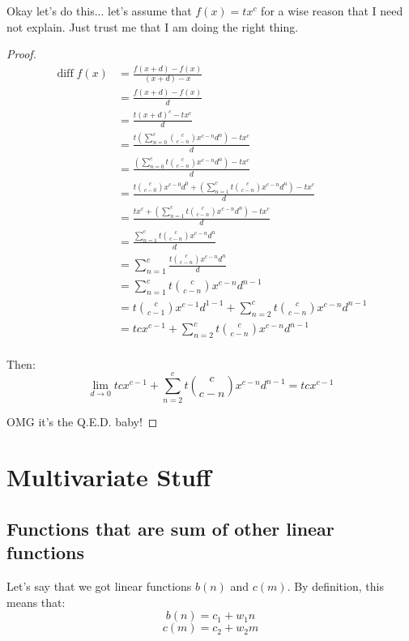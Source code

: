 \documentclass{report}
\DeclareMathOperator{\diff}{diff}
\begin{document}
Okay let's do this... let's assume that $f(x) = tx^c$ for a wise reason that I
need not explain. Just trust me that I am doing the right thing.
\begin{proof}
    \[\begin{split}
        \diff f(x) &= \frac{f(x+d) - f(x)}{(x+d)-x}\\
                   &= \frac{f(x+d) - f(x)}{d}\\
                   &= \frac{t(x+d)^c - tx^c}{d}\\
                   &= \frac{t(\sum_{n=0}^c {c \choose c-n}x^{c-n}d^n) - tx^c}{d}\\
                   &= \frac{(\sum_{n=0}^c t {c \choose c-n}x^{c-n}d^n) - tx^c}{d}\\
                   &= \frac{t {c \choose c-0}x^{c-0}d^0 + (\sum_{n=1}^c t {c \choose c-n}x^{c-n}d^n) - tx^c}{d}\\
                   &= \frac{tx^{c} + (\sum_{n=1}^c t {c \choose c-n}x^{c-n}d^n) - tx^c}{d}\\
                   &= \frac{\sum_{n=1}^c t {c \choose c-n}x^{c-n}d^n}{d}\\
                   &= \sum_{n=1}^c \frac{t {c \choose c-n}x^{c-n}d^n}{d}\\
                   &= \sum_{n=1}^c t {c \choose c-n}x^{c-n}d^{n-1}\\
                   &= t {c \choose c-1}x^{c-1}d^{1-1} + \sum_{n=2}^c t {c \choose c-n}x^{c-n}d^{n-1}\\
                   &= tcx^{c-1} + \sum_{n=2}^c t {c \choose c-n}x^{c-n}d^{n-1}\\
    \end{split}\]

    Then:
    \[\lim_{d \rightarrow 0} tcx^{c-1} + \sum_{n=2}^c t {c \choose
    c-n}x^{c-n}d^{n-1} = tcx^{c-1}\]

    OMG it's the Q.E.D. baby!
\end{proof}


\chapter{Multivariate Stuff}
    \section{Functions that are sum of other linear functions}
        Let's say that we got linear functions $b(n)$ and $c(m)$. By
        definition, this means that:
        \begin{equation}
            b(n) = c_1 + w_1n
        \end{equation}
        \begin{equation}
            c(m) = c_2 + w_2m
        \end{equation}
\end{document}
